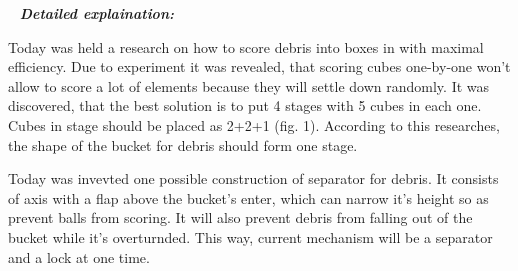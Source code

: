    \newline
  \textit{\textbf{Detailed explaination:}}
  \begin{enumerate*}
  	\item Today was held a research on how to score debris into boxes in with maximal efficiency. Due to experiment it was revealed, that scoring cubes one-by-one won't allow to score a lot of elements because they will settle down randomly. It was discovered, that the best solution is to put 4 stages with 5 cubes in each one. Cubes in stage should be placed as 2+2+1 (fig. 1). According to this researches, the shape of the bucket for debris should form one stage.
  	\begin{figure}[H]
  		\begin{minipage}[h]{1\linewidth}
  			\caption{}
  		\end{minipage}
  	\end{figure}
  	
  	\item Today was invevted one possible construction of separator for debris. It consists of axis with a flap above the bucket's enter, which can narrow it's height so as prevent balls from scoring. It will also prevent debris from falling out of the bucket while it's overturnded. This way, current mechanism will be a separator and a lock at one time.
  	\begin{figure}[H]
  		\begin{minipage}[h]{1\linewidth}
  		  \caption{}
  		\end{minipage}
  	\end{figure}
  	

\end{enumerate*}
